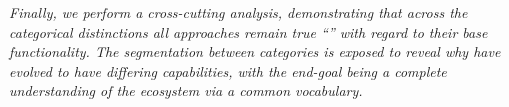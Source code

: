 \documentclass{sig-alternate}
\begin{document}

\textit{Finally, we perform
a cross-cutting analysis, demonstrating that across the categorical
distinctions all approaches remain true ``\pilotjobs'' with regard
to their base functionality.  The segmentation between categories
is exposed to reveal why \pilotjobs have evolved to have
differing capabilities, with the end-goal being a
complete understanding of the \pilotjob ecosystem via a common
vocabulary.}

\end{document}
